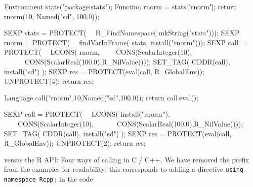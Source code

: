 \begin{table*}[t]
  \begin{minipage}[t]{0.465\linewidth}
    \begin{example}
Environment stats("package:stats");
Function rnorm = stats["rnorm"];
return rnorm(10, Named("sd", 100.0));
    \end{example}
  \end{minipage}
  \begin{minipage}{0.06\linewidth}
    \phantom{XXX}
  \end{minipage}
  \begin{minipage}[t]{0.465\linewidth}
    \begin{example}
SEXP stats = PROTECT( 
\ \ R_FindNamespace( mkString("stats")));
SEXP rnorm = PROTECT( 
\ \ findVarInFrame( stats, install("rnorm")));
SEXP call  = PROTECT( 
\ \ LCONS( rnorm, 
\ \ \ \ CONS(ScalarInteger(10), 
\ \ \ \ \ \ CONS(ScalarReal(100.0),R_NilValue))));
SET_TAG( CDDR(call), install("sd") );
SEXP res = PROTECT(eval(call, R_GlobalEnv));
UNPROTECT(4);
return res;
    \end{example}
  \end{minipage}


  \begin{minipage}[t]{0.465\linewidth}
    \begin{example}
Language call("rnorm",10,Named("sd",100.0));
return call.eval();
    \end{example}
  \end{minipage}
  \begin{minipage}{0.06\linewidth}
    \phantom{XXX}
  \end{minipage}
  \begin{minipage}[t]{0.465\linewidth}
    \begin{example}
SEXP call  = PROTECT( 
\ \ LCONS( install("rnorm"), 
\ \ \ \ CONS(ScalarInteger(10), 
\ \ \ \ \ \ CONS(ScalarReal(100.0),R_NilValue))));
SET_TAG( CDDR(call), install("sd") );
SEXP res = PROTECT(eval(call, R_GlobalEnv));
UNPROTECT(2);
return res;
    \end{example}
  \end{minipage}
  \caption{ versus the R API: Four ways of calling  in C / C++. 
  We have removed the  prefix from the
  examples for readability; this corresponds to adding a directive
  \texttt{using namespace Rcpp;} in the code}
  \label{fig:rnormCode}
\end{table*}

